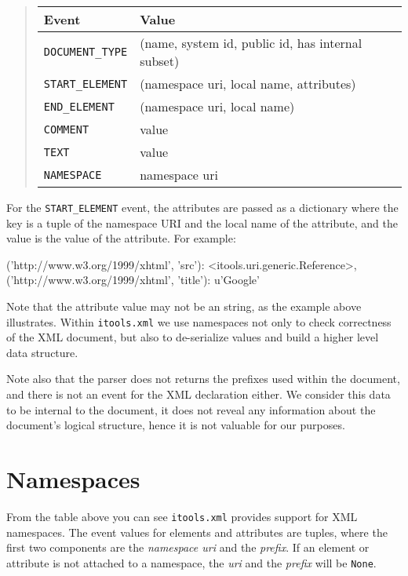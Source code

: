 \begin{quote}
  \begin{tabular}{ll}
    Event & Value\\\hline
    {\tt DOCUMENT\_TYPE} & (name, system id, public id, has internal subset)\\
    {\tt START\_ELEMENT} & (namespace uri, local name, attributes)\\
    {\tt END\_ELEMENT} & (namespace uri, local name)\\
    {\tt COMMENT} & value\\
    {\tt TEXT} & value\\
    {\tt NAMESPACE} & namespace uri\\
  \end{tabular}
\end{quote}

For the {\tt START\_ELEMENT} event, the attributes are passed as a dictionary
where the key is a tuple of the namespace URI and the local name of the
attribute, and the value is the value of the attribute. For example:

\begin{code}
  {('http://www.w3.org/1999/xhtml', 'src'): <itools.uri.generic.Reference>,
   ('http://www.w3.org/1999/xhtml', 'title'): u'Google'}
\end{code}

Note that the attribute value may not be an string, as the example above
illustrates. Within {\tt itools.xml} we use namespaces not only to check
correctness of the XML document, but also to de-serialize values and build
a higher level data structure.

Note also that the parser does not returns the prefixes used within the
document, and there is not an event for the XML declaration either. We
consider this data to be internal to the document, it does not reveal
any information about the document's logical structure, hence it is not
valuable for our purposes.


\section{Namespaces}

From the table above you can see {\tt itools.xml} provides support for XML
namespaces. The event values for elements and attributes are tuples, where
the first two components are the {\em namespace uri} and the {\em prefix}.
If an element or attribute is not attached to a namespace, the {\em uri}
and the {\em prefix} will be {\tt None}.

